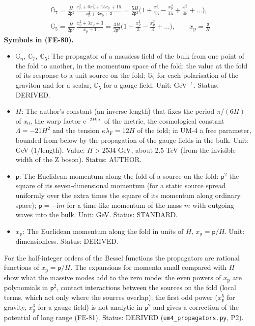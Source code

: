 \documentclass[
  10pt,
]{article}
\providecommand{\tightlist}{%
  \setlength{\itemsep}{0pt}\setlength{\parskip}{0pt}}
\begin{document}
\[
\begin{aligned}
&\mathbb{G}_7 = \frac{H}{2\mathsf{p}^2}\,\frac{x_{\mathrm{p}}^3 + 6x_{\mathrm{p}}^2 + 15x_{\mathrm{p}} + 15}{x_{\mathrm{p}}^2 + 3x_{\mathrm{p}} + 3}
 = \frac{5H}{2\mathsf{p}^2}\Big(1 + \frac{x_{\mathrm{p}}^2}{15} - \frac{x_{\mathrm{p}}^4}{45} + \frac{x_{\mathrm{p}}^5}{45} + \dots\Big),\\
&\mathbb{G}_5 = \frac{H}{2\mathsf{p}^2}\,\frac{x_{\mathrm{p}}^2 + 3x_{\mathrm{p}} + 3}{x_{\mathrm{p}} + 1}
 = \frac{3H}{2\mathsf{p}^2}\Big(1 + \frac{x_{\mathrm{p}}^2}{3} - \frac{x_{\mathrm{p}}^3}{3} + \dots\Big),\qquad x_{\mathrm{p}} = \frac{\mathsf{p}}{H}
\end{aligned} \tag{FE-80}
\] \textbf{Symbols in (FE-80).}

\begin{itemize}
\tightlist
\item
  \(\mathbb{G}_n,\ \mathbb{G}_7,\ \mathbb{G}_5\): The propagator of a
  massless field of the bulk from one point of the fold to another, in
  the momentum space of the fold: the value at the fold of its response
  to a unit source on the fold; \(\mathbb{G}_7\) for each polarisation
  of the graviton and for a scalar, \(\mathbb{G}_5\) for a gauge field.
  Unit: GeV\(^{-1}\). Status: DERIVED.
\item
  \(H\): The author's constant (an inverse length) that fixes the period
  \(\pi/(6H)\) of \(x_0\), the warp factor
  \(\mathrm{e}^{-2H\lvert\sigma\rvert}\) of the metric, the cosmological
  constant \(\Lambda = -21H^2\) and the tension
  \(\kappa\lambda_{\mathrm{F}} = 12H\) of the fold; in UM-4 a free
  parameter, bounded from below by the propagation of the gauge fields
  in the bulk. Unit: GeV (1/length). Value: \(H > 2534\) GeV, about 2.5
  TeV (from the invisible width of the Z boson). Status: AUTHOR.
\item
  \(\mathsf{p}\): The Euclidean momentum along the fold of a source on
  the fold: \(\mathsf{p}^2\) the square of its seven-dimensional
  momentum (for a static source spread uniformly over the extra times
  the square of its momentum along ordinary space);
  \(\mathsf{p} = -\mathrm{i}m\) for a time-like momentum of the mass
  \(m\) with outgoing waves into the bulk. Unit: GeV. Status: STANDARD.
\item
  \(x_{\mathrm{p}}\): The Euclidean momentum along the fold in units of
  \(H\), \(x_{\mathrm{p}} = \mathsf{p}/H\). Unit: dimensionless. Status:
  DERIVED.
\end{itemize}

For the half-integer orders of the Bessel functions the propagators are
rational functions of \(x_{\mathrm{p}} = \mathsf{p}/H\). The expansions
for momenta small compared with \(H\) show what the massive modes add to
the zero mode: the even powers of \(x_{\mathrm{p}}\) are polynomials in
\(\mathsf{p}^2\), contact interactions between the sources on the fold
(local terms, which act only where the sources overlap); the first odd
power (\(x_{\mathrm{p}}^5\) for gravity, \(x_{\mathrm{p}}^3\) for a
gauge field) is not analytic in \(\mathsf{p}^2\) and gives a correction
of the potential of long range (FE-81). Status: DERIVED
(\texttt{um4\_propagators.py}, P2).
\end{document}
